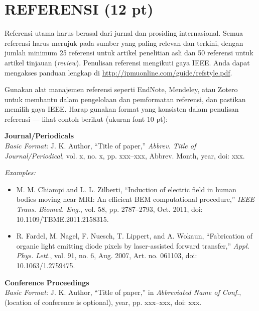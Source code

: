 \documentclass[10pt,a4paper]{article}
\begin{document}
\section*{REFERENSI (12 pt)}

\begingroup
\fontsize{10pt}{12pt}\selectfont
Referensi utama harus berasal dari jurnal dan prosiding internasional. Semua referensi harus merujuk pada sumber yang paling relevan dan terkini, dengan jumlah minimum 25 referensi untuk artikel penelitian asli dan 50 referensi untuk artikel tinjauan (\textit{review}). Penulisan referensi mengikuti gaya IEEE. Anda dapat mengakses panduan lengkap di \url{http://ipmuonline.com/guide/refstyle.pdf}.

Gunakan alat manajemen referensi seperti EndNote, Mendeley, atau Zotero untuk membantu dalam pengelolaan dan pemformatan referensi, dan pastikan memilih gaya IEEE. Harap gunakan format yang konsisten dalam penulisan referensi --- lihat contoh berikut (ukuran font 10 pt):

\vspace{4pt}
\textbf{Journal/Periodicals}\\
\textit{Basic Format:}
J. K. Author, ``Title of paper,'' \textit{Abbrev. Title of Journal/Periodical}, vol. x, no. x, pp. xxx--xxx, Abbrev. Month, year, doi: xxx.

\textit{Examples:}
\begin{itemize}
    \setlength{\itemsep}{0pt}
    \setlength{\parskip}{0pt}
    \item M. M. Chiampi and L. L. Zilberti, ``Induction of electric field in human bodies moving near MRI: An efficient BEM computational procedure,'' \textit{IEEE Trans. Biomed. Eng.}, vol. 58, pp. 2787--2793, Oct. 2011, doi: 10.1109/TBME.2011.2158315.
    \item R. Fardel, M. Nagel, F. Nuesch, T. Lippert, and A. Wokaun, ``Fabrication of organic light emitting diode pixels by laser-assisted forward transfer,'' \textit{Appl. Phys. Lett.}, vol. 91, no. 6, Aug. 2007, Art. no. 061103, doi: 10.1063/1.2759475.
\end{itemize}

\textbf{Conference Proceedings}\\
\textit{Basic Format:}
J. K. Author, ``Title of paper,'' in \textit{Abbreviated Name of Conf.}, (location of conference is optional), year, pp. xxx--xxx, doi: xxx.
\end{document}
